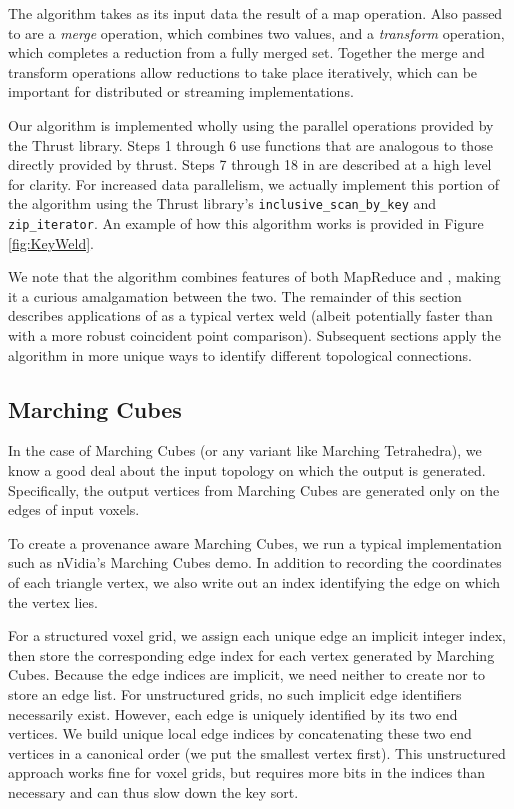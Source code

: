 \documentclass[10pt,journal,cspaper,compsoc]{IEEEtran}
\begin{document}
The  algorithm takes as its input data the result of a map
operation.  Also passed to  are a \emph{merge} operation, which
combines two values, and a \emph{transform} operation, which completes a
reduction from a fully merged set.  Together the merge and transform
operations allow reductions to take place iteratively, which can be
important for distributed or streaming implementations.

Our  algorithm is implemented wholly using the parallel
operations provided by the Thrust library.  Steps 1 through 6 use functions
that are analogous to those directly provided by thrust.
Steps 7 through 18 in  are described at a high level for clarity. For increased data parallelism, we actually implement this portion of the algorithm using the Thrust library's \texttt{inclusive\_scan\_by\_key} and \texttt{zip\_iterator}. An example of how this algorithm works is provided in Figure \ref{fig:KeyWeld}.

We note that the  algorithm combines features of both
MapReduce and , making it a curious amalgamation between
the two.  The remainder of this section describes applications of
 as a typical vertex weld (albeit potentially faster than
 with a more robust coincident point comparison).
Subsequent sections apply the  algorithm in more
unique ways to identify different topological connections.

\subsection{Marching Cubes}
\label{sec:MarchingCubes}

In the case of Marching Cubes (or any variant like Marching Tetrahedra), we
know a good deal about the input topology on which the output is
generated. Specifically, the output vertices from Marching Cubes are
generated only on the edges of input voxels.

To create a provenance aware Marching Cubes, we run a typical
implementation such as nVidia's Marching Cubes demo.  In addition to
recording the coordinates of each triangle vertex, we also write out an
index identifying the edge on which the vertex lies.

For a structured voxel grid, we assign each unique edge an implicit integer
index, then store the corresponding edge index for each vertex generated by
Marching Cubes.  Because the edge indices are implicit, we need neither to
create nor to store an edge list.  For unstructured grids, no such implicit
edge identifiers necessarily exist.  However, each edge is uniquely
identified by its two end vertices.  We build unique local edge indices by
concatenating these two end vertices in a canonical order (we put the
smallest vertex first).  This unstructured approach works fine for voxel
grids, but requires more bits in the indices than necessary and can thus
slow down the key sort.
\end{document}
